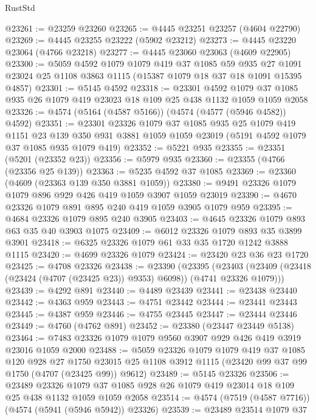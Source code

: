 \begin{lexlean}{RustStd}
\begin{coremodule}
{\begin{coremodule}
{{{{{{{{{{{{{{{{{{{{{{{{{{{{{{{{{{{@23261 := @23259 @23260
@23265 := @4445 @23251 @23257 (@4604 @22790)
@23269 := @4445 @23255 @23222 (@5902 @23212)
@23273 := @4445 @23220 @23064 (@4766 @23218)
@23277 := @4445 @23060 @23063 (@4609 @22905)
@23300 := @5059
    @4592
    @1079
    @1079
    @419
    @37
    @1085
    @59
    @935
    @27
    @1091
    @23024
    @25
    @1108
    @3863
    @1115
    (@15387 @1079 @18 @37 @18 @1091 @15395 @4857)
@23301 := @5145 @4592
@23318 := @23301
    @4592
    @1079
    @37
    @1085
    @935
    @26
    @1079
    @419
    @23023
    @18
    @109
    @25
    @438
    @1132
    @1059
    @1059
    @2058
@23326 := @4574 (@5164 (@4587 @5166)) (@4574 (@4577 (@5946 @4582)) @4592)
@23351 := @23301
    @23326
    @1079
    @37
    @1085
    @935
    @25
    @1079
    @419
    @1151
    @23
    @139
    @350
    @931
    @3881
    @1059
    @1059
    @23019
    (@5191 @4592 @1079 @37 @1085 @935 @1079 @419)
@23352 := @5221 @935
@23355 := @23351 (@5201 (@23352 @23))
@23356 := @5979 @935
@23360 := @23355 (@4766 (@23356 @25 @139))
@23363 := @5235 @4592 @37 @1085
@23369 := @23360 (@4609 (@23363 @139 @350 @3881 @1059))
@23380 := @9491 @23326 @1079 @1079 @896 @929 @426 @419 @1059 @3907 @1059 @23019
@23390 := @4670 @23326 @1079 @891 @895 @240 @419 @1059 @3905 @1079 @959
@23395 := @4684 @23326 @1079 @895 @240 @3905
@23403 := @4645 @23326 @1079 @893 @63 @35 @40 @3903 @1075
@23409 := @6012 @23326 @1079 @893 @35 @3899 @3901
@23418 := @6325 @23326 @1079 @61 @33 @35 @1720 @1242 @3888 @1115
@23420 := @4699 @23326 @1079
@23424 := @23420 @23 @36 @23 @1720
@23425 := @4708 @23326
@23438 := @23390
    (@23395
      (@23403 (@23409 (@23418 (@23424 (@4707 (@23425 @23)) @9353) @6098)) (@4741 @23326 @1079)))
@23439 := @4292 @891
@23440 := @4489 @23439
@23441 := @23438 @23440
@23442 := @4363 @959
@23443 := @4751 @23442
@23444 := @23441 @23443
@23445 := @4387 @959
@23446 := @4755 @23445
@23447 := @23444 @23446
@23449 := @4760 (@4762 @891)
@23452 := @23380 (@23447 @23449 @5138)
@23464 := @7483 @23326 @1079 @1079 @9560 @3907 @929 @426 @419 @3919 @23016 @1059 @2000
@23488 := @5059
    @23326
    @1079
    @1079
    @419
    @37
    @1085
    @120
    @928
    @27
    @1750
    @23015
    @25
    @1108
    @3912
    @1115
    (@23420 @99 @37 @99 @1750 (@4707 (@23425 @99)) @9612)
@23489 := @5145 @23326
@23506 := @23489
    @23326
    @1079
    @37
    @1085
    @928
    @26
    @1079
    @419
    @23014
    @18
    @109
    @25
    @438
    @1132
    @1059
    @1059
    @2058
@23514 := @4574 (@7519 (@4587 @7716)) (@4574 (@5941 (@5946 @5942)) @23326)
@23539 := @23489
    @23514
    @1079
    @37
}}}}}}}}}}}}}}}}}}}}}}}}}}}}}}}}}}}
\end{coremodule}}
\end{coremodule}
\end{lexlean}
